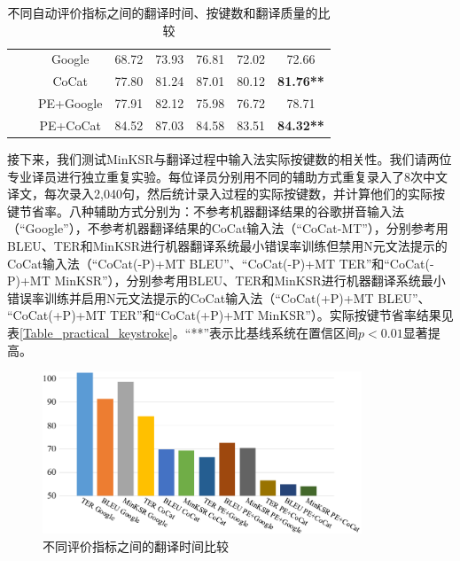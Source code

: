 \begin{table}[!t]
\begin{threeparttable}
\begin{tabular}{*{8}{|c}|}
			&  &    Google &  68.72 &  73.93 &  76.81 &  72.02 &  72.66 \\
			&                           &     CoCat &  77.80 &  81.24 &  87.01 &  80.12 &  \textbf{81.76**} \\
			&                           & PE+Google &  77.91 &  82.12 &  75.98 &  76.72 &  78.71 \\
			&                           &  PE+CoCat &  84.52 &  87.03 &  84.58 &  83.51 &  \textbf{84.32**} \\
			\hline	
		\end{tabular}
	\end{threeparttable}
	\caption{不同自动评价指标之间的翻译时间、按键数和翻译质量的比较}
	\label{Table_compare_merics}
\end{table}

接下来，我们测试MinKSR与翻译过程中输入法实际按键数的相关性。我们请两位专业译员进行独立重复实验。每位译员分别用不同的辅助方式重复录入了8次中文译文，每次录入2,040句，然后统计录入过程的实际按键数，并计算他们的实际按键节省率。八种辅助方式分别为：不参考机器翻译结果的谷歌拼音输入法（“Google”），不参考机器翻译结果的CoCat输入法（“CoCat-MT”），分别参考用BLEU、TER和MinKSR进行机器翻译系统最小错误率训练但禁用N元文法提示的CoCat输入法（“CoCat(-P)+MT BLEU”、“CoCat(-P)+MT TER”和“CoCat(-P)+MT MinKSR”），分别参考用BLEU、TER和MinKSR进行机器翻译系统最小错误率训练并启用N元文法提示的CoCat输入法（“CoCat(+P)+MT BLEU”、\linebreak 
“CoCat(+P)+MT TER”和“CoCat(+P)+MT MinKSR”）。实际按键节省率结果见表\ref{Table_practical_keystroke}。“**”表示比基线系统在置信区间$p<0.01$显著提高。

\begin{figure}[!t]
	\centering
	\includegraphics[width=0.85\textwidth]{Figure/Figure_3_10.pdf}
	\caption{不同评价指标之间的翻译时间比较}
	\label{Fig_metric_time}
\end{figure}

